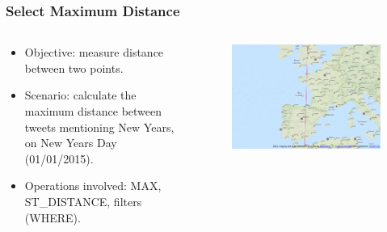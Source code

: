 \documentclass[hyperref={pdfpagelabels=true}]{beamer}
\begin{document}
\begin{frame}
\frametitle{Select Maximum Distance}
\begin{columns}
  \begin{column}{0.5\textwidth}
  \begin{itemize}    
    \item<1->Objective: measure distance between two points.
    \item<1->Scenario: calculate the maximum distance between tweets mentioning New Years, on New Years Day (01/01/2015).
    \item<1->Operations involved: MAX, ST\_DISTANCE, filters (WHERE).    
  \end{itemize} 
 \end{column}  
  \begin{column}{0.5\textwidth}      
    \begin{figure}       
	\includegraphics[width=\textwidth]{dist.png}      
     \end{figure} 
 \end{column}  
\end{columns}           
\end{frame}
\end{document}

